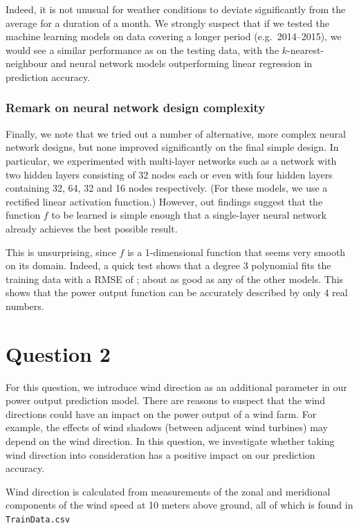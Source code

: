 \documentclass[11pt]{article}
\begin{document}
Indeed, it is not unusual for weather conditions to deviate significantly from the average for a duration of a month.
We strongly suspect that if we tested the machine learning models on data covering a longer period (e.g.\ 2014--2015), we would see a similar performance as on the testing data, with the $k$-nearest-neighbour and neural network models outperforming linear regression in prediction accuracy.


\subsubsection*{Remark on neural network design complexity}

Finally, we note that we tried out a number of alternative, more complex neural network designs, but none improved significantly on the final simple design.
In particular, we experimented with multi-layer networks such as a network with two hidden layers consisting of 32 nodes each or even with four hidden layers containing 32, 64, 32 and 16 nodes respectively.
(For these models, we use a rectified linear activation function.)
However, out findings suggest that the function $f$ to be learned is simple enough that a single-layer neural network already achieves the best possible result.

This is unsurprising, since $f$ is a 1-dimensional function that seems very smooth on its domain.
Indeed, a quick test shows that a degree 3 polynomial fits the training data with a RMSE of ; about as good as any of the other models.
This shows that the power output function can be accurately described by only 4 real numbers.


\clearpage
\section*{Question 2}
For this question, we introduce wind direction as an additional parameter in our power output prediction model.
There are reasons to suspect that the wind directions could have an impact on the power output of a wind farm.
For example, the effects of wind shadows (between adjacent wind turbines) may depend on the wind direction.
In this question, we investigate whether taking wind direction into consideration has a positive impact on our prediction accuracy.

Wind direction is calculated from measurements of the zonal and meridional components of the wind speed at 10 meters above ground, all of which is found in \texttt{TrainData.csv} 
\end{document}
